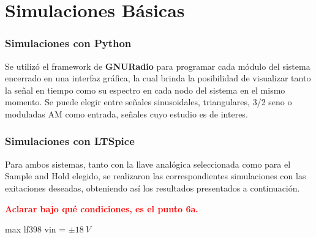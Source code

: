 


\section{Simulaciones Básicas}

\subsubsection{Simulaciones con Python}
Se utilizó el framework de \textbf{GNURadio} para programar cada módulo del sistema encerrado en una interfaz gráfica, la cual brinda la posibilidad de visualizar tanto la señal en tiempo como su espectro en cada nodo del sistema en el mismo momento. Se puede elegir entre señales sinusoidales, triangulares, 3/2 seno o moduladas AM como entrada, señales cuyo estudio es de interes.

\subsubsection{Simulaciones con LTSpice}
Para ambos sistemas, tanto con la llave analógica seleccionada como para el Sample and Hold elegido, se realizaron las correspondientes simulaciones con las exitaciones deseadas, obteniendo así los resultados presentados a continuación.

\textcolor{red}{\textbf{Aclarar bajo qué condiciones, es el punto 6a.}}

max lf398 vin = $\pm 18 \ V$

